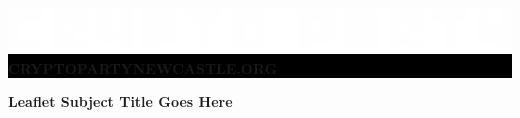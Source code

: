 \documentclass[10.5pt,a4paper]{article} %
\begin{document}

\begin{center}
	\vspace{1cm}
	\colorbox{Black}{
		\begin{minipage}{18.5cm}
			\begin{center}
			\color{white}
			\vspace{0.3cm}
	             \includegraphics[width=1\textwidth]{organisationlogo.eps} %
	        \\[10pt]
			     \textbf{{\LARGE CRYPTOPARTYNEWCASTLE.ORG}} %
			\vspace{0.3cm}
			\end{center}
		\end{minipage}
	}
\end{center}


\begin{center}
\vspace{0.5cm}
\textbf{{\LARGE Leaflet Subject Title Goes Here} %
\vspace{0.5cm}
}\end{center}
\end{document}
